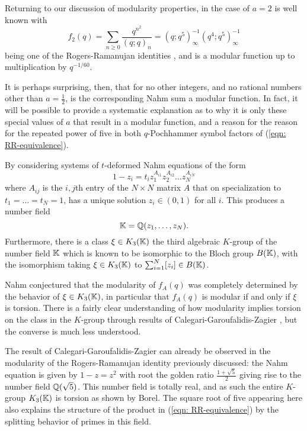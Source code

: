 Returning to our discussion of modularity properties, in the case of $a=2$ is well known with 
\begin{equation}\label{eqn: RR-equivalence}
    f_{2}(q)=\sum_{n\geq0}\frac{q^{n^{2}}}{(q;q)_{n}}=(q;q^{5})_{\infty}^{-1}(q^{4};q^{5})^{-1}_{\infty}
\end{equation}
being one of the Rogers-Ramanujan identities \cite{OEIS-1}, and is a modular function up to multiplication by $q^{-1/60}$. 

It is perhaps surprising, then, that for no other integers, and no rational numbers other than $a=\frac{1}{2}$, is the corresponding Nahm sum a modular function. In fact, it will be possible to provide a systematic explanation as to why it is only these special values of $a$ that result in a modular function, and a reason for the reason for the repeated power of five in both $q$-Pochhammer symbol factors of (\ref{eqn: RR-equivalence}). 

By considering systems of $t$-deformed Nahm equations of the form 
$$1-z_{i}=t_{i}z_{1}^{A_{i1}}z_{2}^{A_{i2}}\dots z_{N}^{A_{iN}}$$
where $A_{ij}$ is the $i,j$th entry of the $N\times N$ matrix $A$ that on specialization to $t_{1}=\dots=t_{N}=1$, has a unique solution $z_{i}\in(0,1)$ for all $i$. This produces a number field 
\begin{equation}\label{eqn: number field of Nahm equation}
    \mathbb{K}=\mathbb{Q}(z_{1},\dots,z_{N}).
\end{equation}
Furthermore, there is a class $\xi\in K_{3}(\mathbb{K})$ the third algebraic $K$-group of the number field $\mathbb{K}$ which is known to be isomorphic to the Bloch group $B(\mathbb{K})$, with the isomorphism taking $\xi\in K_{3}(\mathbb{K})$ to $\sum_{i=1}^{N}[z_{i}]\in B(\mathbb{K})$.

Nahm conjectured that the modularity of $f_{A}(q)$ was completely determined by the behavior of $\xi\in K_{3}(\mathbb{K})$, in particular that $f_{A}(q)$ is modular if and only if $\xi$ is torsion. There is a fairly clear understanding of how modularity implies torsion on the class in the $K$-group through results of Calegari-Garoufalidis-Zagier \cite{BlochGroupsNahm}, but the converse is much less understood. 

The result of Calegari-Garoufalidis-Zagier can already be observed in the modularity of the Rogers-Ramanujan identity previously discussed: the Nahm equation is given by $1-z=z^{2}$ with root the golden ratio $\frac{1+\sqrt{5}}{2}$ giving rise to the number field $\mathbb{Q}(\sqrt{5})$. This number field is totally real, and as such the entire $K$-group $K_{3}(\mathbb{K})$ is torsion as shown by Borel. The square root of five appearing here also explains the structure of the product in (\ref{eqn: RR-equivalence}) by the splitting behavior of primes in this field. 

